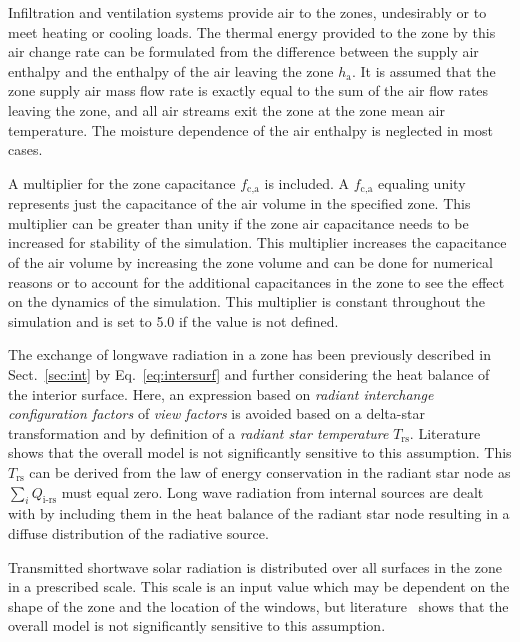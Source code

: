 Infiltration and ventilation systems provide air to the zones, undesirably or to meet heating or cooling loads. The thermal energy provided to the zone by this air change rate can be formulated from the difference between the supply air enthalpy and the enthalpy of the air leaving the zone $h_{\textrm{a}}$. It is assumed that the zone supply air mass flow rate is exactly equal to the sum of the air flow rates leaving the zone, and all air streams exit the zone at the zone mean air temperature. The moisture dependence of the air enthalpy is neglected in most cases.

A multiplier for the zone capacitance $f_{\textrm{c,a}}$ is included. A $f_{\textrm{c,a}}$ equaling unity represents just the capacitance of the air volume in the specified zone. This multiplier can be greater than unity if the zone air capacitance needs to be increased for stability of the simulation. This multiplier increases the capacitance of the air volume by increasing the zone volume and can be done for numerical reasons or to account for the additional capacitances in the zone to see the effect on the dynamics of the simulation. This multiplier is constant throughout the
simulation and is set to 5.0 if the value is not defined. %

The exchange of longwave radiation in a zone has been previously described in Sect.~\ref{sec:int} by Eq.~\ref{eq:intersurf} and further considering the heat balance of the interior surface. Here, an expression based on \emph{radiant interchange configuration factors} of \emph{view factors} is avoided based on a delta-star transformation and by definition of a \emph{radiant star temperature} $T_{\textrm{rs}}$. Literature~\cite{Liesen1997} shows that the overall model is not significantly sensitive to this assumption. This $T_{\textrm{rs}}$ can be derived from the law of energy conservation in the radiant star node as $\sum_{i}Q_{\textrm{i-rs}}$ must equal zero. Long wave radiation from internal sources are dealt with by including them in the heat balance of the radiant star node resulting in a diffuse distribution of the radiative source.

Transmitted shortwave solar radiation is distributed over all surfaces in the zone in a prescribed scale. This scale is an input value which may be dependent on the shape of the zone and the location of the windows, but literature~\cite{Liesen1997} shows that the overall model is not significantly sensitive to this assumption.

